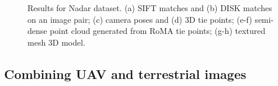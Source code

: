 \begin{figure}
{  } \qquad
  \caption{Results for Nadar dataset. (a) SIFT matches and (b) DISK matches on an image pair; (c) camera poses and (d) 3D tie points; (e-f) semi-dense point cloud generated from RoMA tie points; (g-h) textured mesh 3D model.}
  \label{fig:5:res_nadar}
\end{figure}

\subsection{Combining UAV and terrestrial images}

